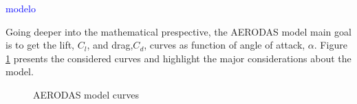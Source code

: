 \textcolor{blue}{modelo}

Going deeper into the mathematical prespective, the AERODAS model main goal is to get the lift, $C_l$, and drag,$C_d$, curves as function of angle of attack, $\alpha$. Figure \ref{fig:aerodas_functions} presents the considered curves and highlight the major considerations about the model.

\begin{figure}[!htb]
    \centering
    \hfill
    \caption{AERODAS model curves}
    \label{fig:aerodas_functions}
\end{figure}


